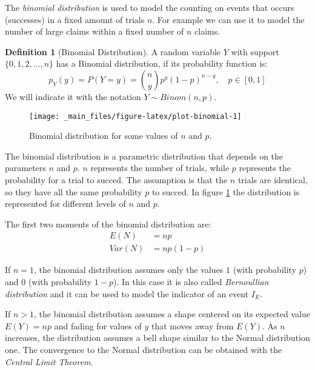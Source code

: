 \documentclass[a4paper, nobind]{templates/ociamthesis}
\theoremstyle{definition}
\newtheorem{definition}{Definition}[chapter]
\theoremstyle{definition}
\theoremstyle{definition}
\theoremstyle{remark}
\begin{document}
The \emph{binomial distribution} is used to model the counting on events that occurs (successes) in a fixed amount of trials \(n\). For example we can use it to model the number of large claims within a fixed number of \(n\) claims.

\begin{definition}[Binomial Distribution]
\label{def:def-binomial} \iffalse (Binomial Distribution) \fi{} A random variable \(Y\) with support \(\{0,1,2, \dots, n \}\) has a Binomial distribution, if its probability function is:
\[
p_Y(y) = P\left( Y = y \right) = \binom{n}{y} p^y (1-p)^{n-y}, \quad p \in [0, 1]
\]
We will indicate it with the notation \(Y \sim Binom(n, p)\).
\end{definition}

\begin{figure}[!hbtp]

{\centering \texttt{[image: \_main\_files/figure-latex/plot-binomial-1]} 

}

\caption{Binomial distribution for some values of $n$ and $p$.}\label{fig:plot-binomial}
\end{figure}

The binomial distribution is a parametric distribution that depends on the parameters \(n\) and \(p\). \(n\) represents the number of trials, while \(p\) represents the probability for a trial to succed. The assumption is that the \(n\) trials are identical, so they have all the same probability \(p\) to succed. In figure \ref{fig:plot-binomial} the distribution is represented for different levels of \(n\) and \(p\).

The first two moments of the binomial distribution are:
\begin{align*}
E(N)   & = np \\
Var(N) & = np(1-p)
\end{align*}

If \(n = 1\), the binomial distribution assumes only the values \(1\) (with probability \(p\)) and \(0\) (with probability \(1-p\)). In this case it is also called \emph{Bernoullian distribution} and it can be used to model the indicator of an event \(I_E\).

If \(n>1\), the binomial distribution assumes a shape centered on its expected value \(E(Y)=np\) and fading for values of \(y\) that moves away from \(E(Y)\). As \(n\) increases, the distribution assumes a bell shape similar to the Normal distribution one. The convergence to the Normal distribution can be obtained with the \emph{Central Limit Theorem}.
\end{document}
